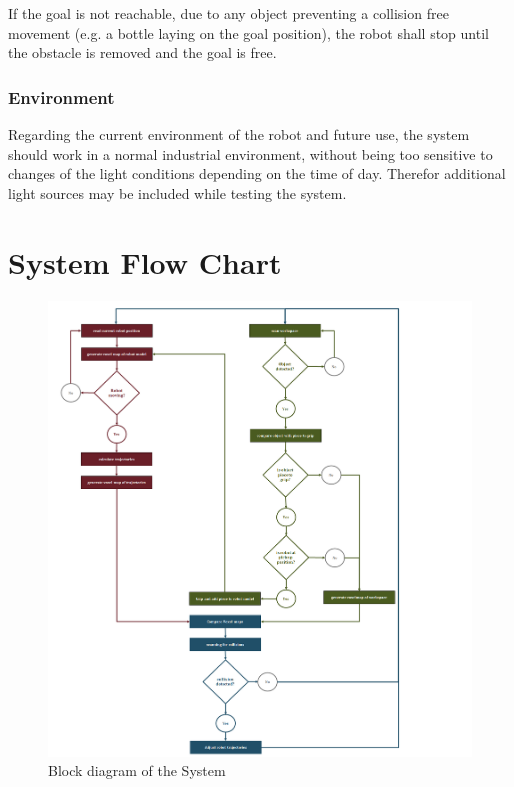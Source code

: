 If the goal is not reachable, due to any object preventing a collision free movement (e.g. a bottle laying on the goal position), the robot shall stop until the obstacle is removed and the goal is free.

\subsubsection{Environment}
Regarding the current environment of the robot and future use, the system should work in a normal industrial environment, without being too sensitive to changes of the light conditions depending on the time of day. Therefor additional light sources may be included while testing the system.


\newpage
\section{System Flow Chart}
\label{sec:flow chart}
\begin{figure}[!ht]
	\centering
	\includegraphics[width=1.2\linewidth]{images/flowchart}
	\caption{Block diagram of the System }
	\label{fig:bd1}
\end{figure}

\newpage


